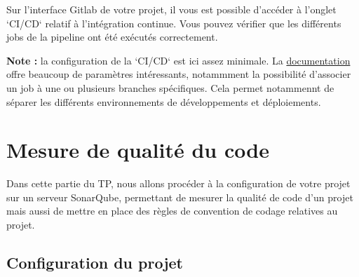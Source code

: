 \documentclass[11pt,a4paper,oneside]{article}
\begin{document}
\vspace{2mm}
Sur l'interface Gitlab de votre projet, il vous est possible d'accéder à l'onglet `CI/CD` relatif à l'intégration continue. Vous pouvez vérifier que les différents jobs de la pipeline ont été exécutés correctement.

\vspace{2mm}
\textbf{Note :} la configuration de la `CI/CD` est ici assez minimale. La \href{https://docs.gitlab.com/ee/ci/}{documentation} offre beaucoup de paramètres intéressants, notammment la possibilité d'associer un job à une ou plusieurs branches spécifiques. Cela permet notammennt de séparer les différents environnements de développements et déploiements.

\section{Mesure de qualité du code}

Dans cette partie du TP, nous allons procéder à la configuration de votre projet sur un serveur SonarQube, permettant de mesurer la qualité de code d'un projet mais aussi de mettre en place des règles de convention de codage relatives au projet. 

%
%
%
%
%

\subsection{Configuration du projet}
\end{document}
